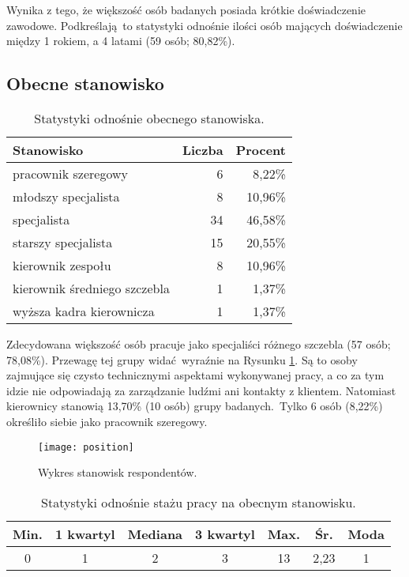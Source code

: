 Wynika z tego, że większość osób badanych posiada krótkie doświadczenie zawodowe. Podkreślają to statystyki odnośnie ilości osób mających doświadczenie między 1 rokiem, a 4 latami (59 osób; 80,82\%).

\subsection{Obecne stanowisko}

\begin{table}[h!]
\begin{center}
\begin{tabular}{l r r}
Stanowisko & Liczba & Procent \\ \hline
pracownik szeregowy & 6 & 8,22\% \\
młodszy specjalista & 8 & 10,96\% \\
specjalista & 34 & 46,58\% \\
starszy specjalista & 15 & 20,55\% \\
kierownik zespołu & 8 & 10,96\% \\
kierownik średniego szczebla & 1 & 1,37\% \\
wyższa kadra kierownicza & 1 & 1,37\% \\
\end{tabular}
\end{center}
\caption{Statystyki odnośnie obecnego stanowiska.}
\label{tab:position-stats}
\end{table}

Zdecydowana większość osób pracuje jako specjaliści różnego szczebla (57 osób; 78,08\%). Przewagę tej grupy widać wyraźnie na Rysunku \ref{fig:position}. Są to osoby zajmujące się czysto technicznymi aspektami wykonywanej pracy, a co za tym idzie nie odpowiadają za zarządzanie ludźmi ani kontakty z klientem. Natomiast kierownicy stanowią 13,70\% (10 osób) grupy badanych. Tylko 6 osób (8,22\%) określiło siebie jako pracownik szeregowy.

\begin{figure}[h]
\begin{center}
\texttt{[image: position]}
\end{center}
\caption{Wykres stanowisk respondentów.}
\label{fig:position}
\end{figure}

\begin{table}[h!]
\begin{center}
\begin{tabular}{c c c c c c c}
Min. & 1 kwartyl & Mediana & 3 kwartyl & Max. & Śr. & Moda \\ \hline
0 & 1 & 2 & 3 & 13 & 2,23 & 1 \\
\end{tabular}
\end{center}
\caption{Statystyki odnośnie stażu pracy na obecnym stanowisku.}
\label{tab:position-years-stats}
\end{table}

